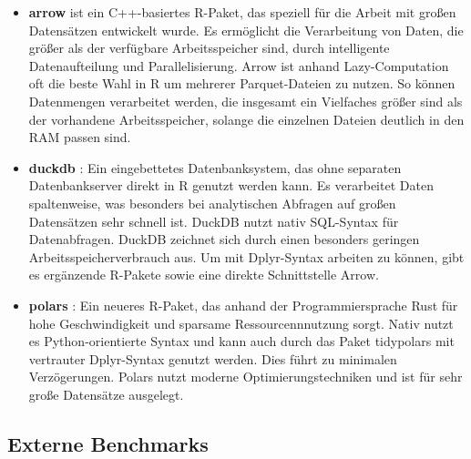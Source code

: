\documentclass[
  german,
  10pt,
  twoside]{article}
\providecommand{\tightlist}{%
  \setlength{\itemsep}{0pt}\setlength{\parskip}{0pt}}
\let\oldtextbf\textbf
\renewcommand{\textbf}[1]{{\color{wistaBlue}\oldtextbf{#1}}}
\begin{document}
\begin{itemize}
\tightlist
\item
  \textbf{arrow} \autocite{R-arrow} ist ein C++-basiertes R-Paket, das
  speziell für die Arbeit mit großen Datensätzen entwickelt wurde. Es
  ermöglicht die Verarbeitung von Daten, die größer als der verfügbare
  Arbeitsspeicher sind, durch intelligente Datenaufteilung und
  Parallelisierung. Arrow ist anhand Lazy-Computation oft die beste Wahl
  in R um mehrerer Parquet-Dateien zu nutzen. So können Datenmengen
  verarbeitet werden, die insgesamt ein Vielfaches größer sind als der
  vorhandene Arbeitsspeicher, solange die einzelnen Dateien deutlich in
  den RAM passen sind.
\item
  \textbf{duckdb} \autocite{R-duckdb}: Ein eingebettetes
  Datenbanksystem, das ohne separaten Datenbankserver direkt in R
  genutzt werden kann. Es verarbeitet Daten spaltenweise, was besonders
  bei analytischen Abfragen auf großen Datensätzen sehr schnell ist.
  DuckDB nutzt nativ SQL-Syntax für Datenabfragen. DuckDB zeichnet sich
  durch einen besonders geringen Arbeitsspeicherverbrauch aus. Um mit
  Dplyr-Syntax arbeiten zu können, gibt es ergänzende R-Pakete sowie
  eine direkte Schnittstelle Arrow.
\item
  \textbf{polars} \autocite{R-polars}: Ein neueres R-Paket, das anhand
  der Programmiersprache Rust für hohe Geschwindigkeit und sparsame
  Ressourcennnutzung sorgt. Nativ nutzt es Python-orientierte Syntax und
  kann auch durch das Paket tidypolars mit vertrauter Dplyr-Syntax
  genutzt werden. Dies führt zu minimalen Verzögerungen. Polars nutzt
  moderne Optimierungstechniken und ist für sehr große Datensätze
  ausgelegt.
\end{itemize}

\subsection{Externe Benchmarks}\label{externe-benchmarks}
\end{document}
